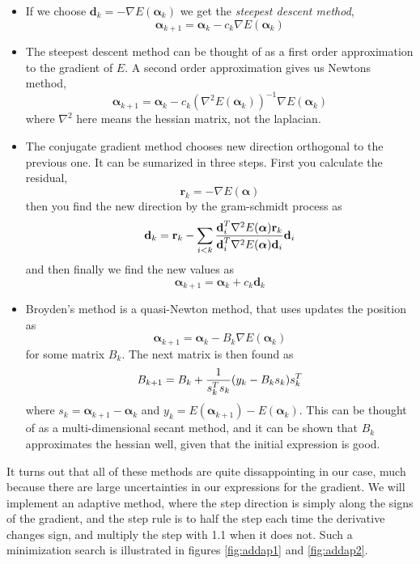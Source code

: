 \documentclass[aps,prc,twocolumn,floatfix]{revtex4}
\def\rvec{\textbf{r}}
\def\alphavec{\boldsymbol\alpha}
\def\dvec{\textbf{d}}
\begin{document}
\begin{itemize}
 \item If we choose $\dvec_k = -\nabla E(\alphavec_k)$ we get the {\it steepest descent method},
 \begin{equation}
  \alphavec_{k+1} = \alphavec_k - c_k\nabla E(\alphavec_k)
 \end{equation}
 
 \item The steepest descent method can be thought of as a first order approximation to the gradient of $E$. A second order approximation gives us Newtons method, 
 \begin{equation}
   \alphavec_{k+1} = \alphavec_k - c_k(\nabla^2 E(\alphavec_k))^{-1} \nabla E(\alphavec_k)
 \end{equation}
 where $\nabla^2$ here means the hessian matrix, not the laplacian.

 \item The conjugate gradient method chooses new direction orthogonal to the previous one. It can be sumarized in three steps. First you calculate the residual, 
 \begin{equation}
  \rvec_k = - \nabla E(\alphavec)
 \end{equation}
 then you find the new direction by the gram-schmidt process as 
 \begin{equation}
  \dvec_{k} = \rvec_k - \sum_{i < k} {\dvec_i^T \nabla^2 E(\alphavec) \rvec_k \over \dvec_i^T \nabla^2 E(\alphavec) \dvec_i}\dvec_i
 \end{equation}
 and then finally we find the new values as
 \begin{equation}
  \alphavec_{k+1} = \alphavec_k + c_k\dvec_k
 \end{equation}
 
\item Broyden's method is a quasi-Newton method, that uses updates the position as 
\begin{equation}
 \alphavec_{k+1} = \alphavec_k - B_k\nabla E(\alphavec_k)
\end{equation}
for some matrix $B_k$. The next matrix is then found as 
\begin{equation}
 B_{k+1} = B_k + {1 \over s_k^T s_k}(y_k - B_k s_k)s_k^T
\end{equation}
where $s_k = \alphavec_{k+1} - \alphavec_k$ and $y_k = E(\alphavec_{k+1}) - E(\alphavec_k)$. This can be thought of as a multi-dimensional secant method, and it can be shown that $B_k$ approximates the hessian well, given that the initial expression is good. 


\end{itemize}
It turns out that all of these methods are quite dissappointing in our case, much because there are large uncertainties in our expressions for the gradient. We will implement an adaptive method, where the step direction is simply along the signs of the gradient, and the step rule is to half the step each time the derivative changes sign, and multiply the step with 1.1 when it does not. Such a minimization search is illustrated in figures \ref{fig:addap1} and \ref{fig:addap2}.
 
\end{document}
